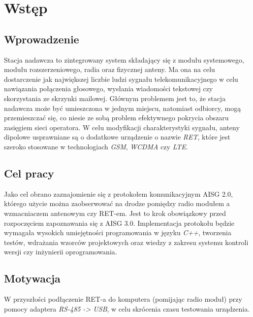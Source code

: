 \chapter{Wstęp}
\section{Wprowadzenie}
	Stacja nadawcza to zintegrowany system składający się z modułu systemowego, modułu rozszerzeniowego, radia oraz fizycznej anteny. 
	Ma ona na celu dostarczenie jak największej liczbie ludzi sygnału telekomunikacyjnego w celu nawiązania połączenia głosowego, 
	wysłania wiadomości tekstowej czy skorzystania ze skrzynki mailowej. Głównym problemem jest to, że stacja nadawcza może być umieszczona w jednym miejscu, 
	natomiast odbiorcy, mogą przemieszczać się, co niesie ze sobą problem efektywnego pokrycia obszaru zasięgiem sieci operatora.
	W celu modyfikacji charakterystyki sygnału, anteny dipolowe usprawniane są o dodatkowe urządzenie o nazwie \textit{RET}, które jest szeroko stosowane w technologiach 
	\textit{GSM}, \textit{WCDMA} czy \textit{LTE}.

\section{Cel pracy}
	Jako cel obrano zaznajomienie się z protokołem komunikacyjnym AISG 2.0, którego użycie można zaobserwować na drodze pomiędzy 
	radio modułem a wzmacniaczem antenowym czy RET-em. Jest to krok obowiązkowy przed rozpoczęciem zapoznawania się z AISG 3.0.
	Implementacja protokołu będzie wymagała wysokich umiejętności programowania w języku \textit{C++}, 
	tworzenia testów, wdrażania wzorców projektowych oraz wiedzy z zakresu systemu kontroli wersji czy inżynierii oprogramowania.

\section{Motywacja}
	W przyszłości podłączenie RET-a do komputera (pomijając radio moduł) przy pomocy adaptera \textit{RS-485 -> USB}, w celu skrócenia czasu testowania urządzenia.
